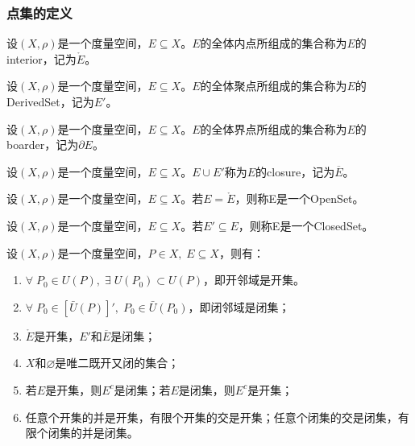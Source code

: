 \subsubsection{点集的定义}
\begin{definition}
	设$(X,\rho)$是一个度量空间，$E\subseteq X$。$E$的全体内点所组成的集合称为$E$的\gls{interior}，记为$\mathring{E}$。
\end{definition}
\begin{definition}
	设$(X,\rho)$是一个度量空间，$E\subseteq X$。$E$的全体聚点所组成的集合称为$E$的\gls{DerivedSet}，记为$E'$。
\end{definition}
\begin{definition}
	设$(X,\rho)$是一个度量空间，$E\subseteq X$。$E$的全体界点所组成的集合称为$E$的\gls{boarder}，记为$\partial E$。
\end{definition}
\begin{definition}
	设$(X,\rho)$是一个度量空间，$E\subseteq X$。$E\cup E'$称为$E$的\gls{closure}，记为$\overline{E}$。
\end{definition}
\begin{definition}
	设$(X,\rho)$是一个度量空间，$E\subseteq X$。若$E=\mathring{E}$，则称E是一个\gls{OpenSet}。
\end{definition}
\begin{definition}
	设$(X,\rho)$是一个度量空间，$E\subseteq X$。若$E'\subseteq E$，则称E是一个\gls{ClosedSet}。
\end{definition}
\begin{property}\label{prop:OpenClosedSet}
	设$(X,\rho)$是一个度量空间，$P\in X,\;E\subseteq X$，则有：
	\begin{enumerate}
		\item $\forall\;P_0\in U(P),\;\exists\;U(P_0)\subset U(P)$，即开邻域是开集。
		\item $\forall\;P_0\in[\bar{U}(P)]',\;P_0\in \bar{U}(P_0)$，即闭邻域是闭集；
		\item $\mathring{E}$是开集，$E'$和$\overline{E}$是闭集；
		\item $X$和$\varnothing$是唯二既开又闭的集合；
		\item 若$E$是开集，则$E^c$是闭集；若$E$是闭集，则$E^c$是开集；
		\item 任意个开集的并是开集，有限个开集的交是开集；任意个闭集的交是闭集，有限个闭集的并是闭集。
	\end{enumerate}
\end{property}
